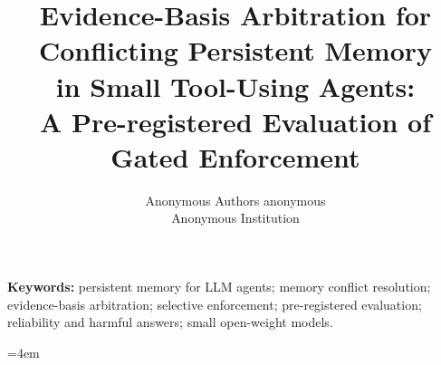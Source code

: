 \documentclass[10pt]{article}
\title{Evidence-Basis Arbitration for Conflicting Persistent Memory\\in Small Tool-Using Agents:\\
A Pre-registered Evaluation of Gated Enforcement}
\author{\name Anonymous Authors \email anonymous \\ \addr Anonymous Institution}
\begin{document}
\maketitle

\begin{abstract}

\end{abstract}

\vspace{-2mm}
\noindent\textbf{Keywords:} persistent memory for LLM agents; memory conflict resolution; evidence-basis
arbitration; selective enforcement; pre-registered evaluation; reliability and harmful answers; small open-weight
models.
\vspace{1mm}

















\begingroup
\sloppy
\emergencystretch=4em


\endgroup

\appendix

\end{document}
